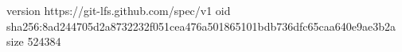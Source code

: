 version https://git-lfs.github.com/spec/v1
oid sha256:8ad244705d2a8732232f051cea476a501865101bdb736dfc65caa640e9ae3b2a
size 524384
